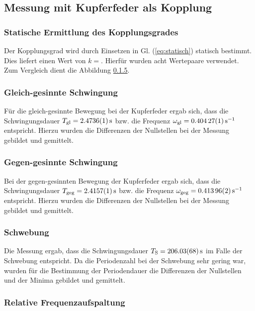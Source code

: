 \documentclass[11pt,a4paper,titlepage, ngerman]{article}
\newcommand{\refeq}[1]{Gl. (\ref{eq:#1})}
\begin{document}
		\subsection{Messung mit Kupferfeder als Kopplung}
			
			\subsubsection{Statische Ermittlung des Kopplungsgrades}							
				
				Der Kopplungsgrad wird durch Einsetzen in \refeq{statisch} statisch bestimmt. Dies liefert einen Wert von $k=$. Hierfür wurden acht Wertepaare verwendet. Zum Vergleich dient die Abbildung \ref{}.
				
			\subsubsection{Gleich-gesinnte Schwingung}
			
				Für die gleich-gesinnte Bewegung bei der Kupferfeder ergab sich, dass die Schwingungsdauer $T_\text{gl} = \SI{2,4736 +- 0,0001}{\second}$ bzw. die Frequenz $\omega_\text{gl}  = \SI{0,40427 +- 0,00001}{\s^{-1}}$ entspricht. Hierzu wurden die Differenzen der Nullstellen bei der Messung gebildet und gemittelt. 
			
			\subsubsection{Gegen-gesinnte Schwingung}
				
				Bei der gegen-gesinnten Bewegung der Kupferfeder ergab sich, dass die Schwingungsdauer $T_\text{geg} = \SI{2,4157 +- 0,0001}{\second}$ bzw. die Frequenz $\omega_\text{geg}  = \SI{0,41396 +- 0,00002}{\s^{-1}}$ entspricht. Hierzu wurden die Differenzen der Nullstellen bei der Messung gebildet und gemittelt. 
				
			\subsubsection{Schwebung}
				
				Die Messung ergab, dass die Schwingungsdauer $T_\text{S} = \SI{206,03 +-0,68}{\second}$ im Falle der Schwebung entspricht. Da die Periodenzahl bei der Schwebung sehr gering war, wurden für die Bestimmung der Periodendauer die Differenzen der Nullstellen und der Minima gebildet und gemittelt.

			\subsubsection{Relative Frequenzaufspaltung}
				
\end{document}
